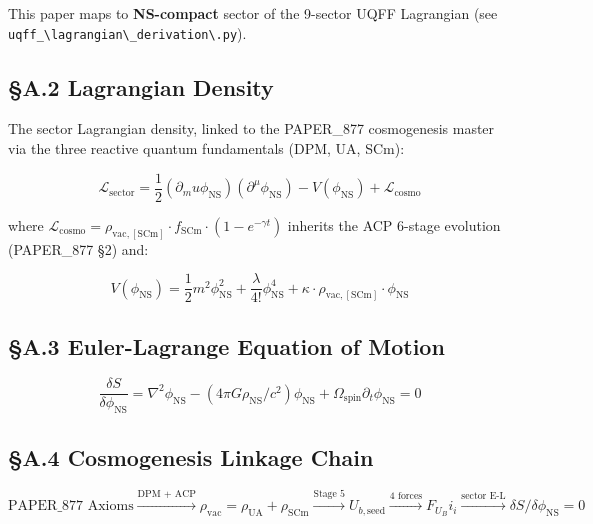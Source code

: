 \documentclass[12pt,a4paper]{article}
\begin{document}
This paper maps to \textbf{NS-compact} sector of the 9-sector UQFF Lagrangian (see \texttt{uqff\_\textbackslash {lagrangian\textbackslash \_derivation\textbackslash }.py}).

\subsection{\S{}A.2 Lagrangian Density}

The sector Lagrangian density, linked to the PAPER\_877 cosmogenesis master via the three reactive quantum fundamentals (DPM, UA, SCm):

\begin{equation}
\mathcal{L}_{\mathrm{sector}} = \frac{1}{2}(\partial_mu \phi_{\mathrm{NS}})(\partial^\mu \phi_{\mathrm{NS}}) - V(\phi_{\mathrm{NS}}) + \mathcal{L}_{\mathrm{cosmo}}
\end{equation}

where $\mathcal{L}_{\mathrm{cosmo}} = \rho_{\mathrm{vac,[SCm]}} \cdot f_{\mathrm{SCm}} \cdot (1 - e^{-\gamma t})$ inherits the ACP 6-stage evolution (PAPER\_877 \S{}2) and:

\begin{equation}
V(\phi_{\mathrm{NS}}) = \frac{1}{2} m^2 \phi_{\mathrm{NS}}^2 + \frac{\lambda}{4!} \phi_{\mathrm{NS}}^4 + \kappa \cdot \rho_{\mathrm{vac,[SCm]}} \cdot \phi_{\mathrm{NS}}
\end{equation}

\subsection{\S{}A.3 Euler-Lagrange Equation of Motion}

\begin{equation}
\boxed{\frac{\delta S}{\delta \phi_{\mathrm{NS}}} = \nabla^2 \phi_{\mathrm{NS}} - (4\pi G \rho_{\mathrm{NS}}/c^2)\phi_{\mathrm{NS}} + \Omega_{\mathrm{spin}} \partial_t \phi_{\mathrm{NS}} = 0}
\end{equation}

\subsection{\S{}A.4 Cosmogenesis Linkage Chain}

\begin{equation}
\text{PAPER\_877 Axioms} \xrightarrow{\text{DPM + ACP}} \rho_{\mathrm{vac}} = \rho_{\mathrm{UA}} + \rho_{\mathrm{SCm}} \xrightarrow{\text{Stage 5}} U_{b,\mathrm{seed}} \xrightarrow{\text{4 forces}} F_U_Bi_i \xrightarrow{\text{sector E-L}} \delta S/\delta \phi_{\mathrm{NS}} = 0
\end{equation}
\end{document}
